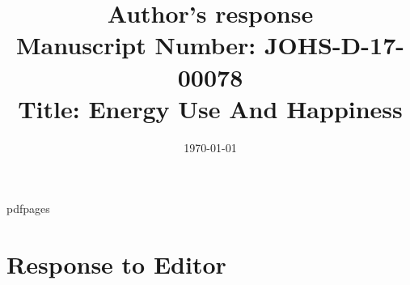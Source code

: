 \marginsize{2cm}{2cm}{0cm}{1cm} %
\renewcommand\familydefault{\sfdefault}


 \renewcommand{\topfraction}{.9}	%
 \renewcommand{\bottomfraction}{.9}	%
 \renewcommand{\textfraction}{0.1}	%

 
\newenvironment{ig}[1]{
\begin{center}
 \texttt{[image: \#1]} 
\end{center}}

\usepackage{pdfpages}

\newlength\tindent
\setlength{\tindent}{\parindent}
\setlength{\parindent}{0pt}
\renewcommand{\indent}{\hspace*{\tindent}}


\date{{}\today}
\title{Author's response\\ {\large Manuscript Number: JOHS-D-17-00078 \\ Title:  Energy Use And Happiness }}

\author{}


\maketitle

\tableofcontents

\section{Response to Editor} 


